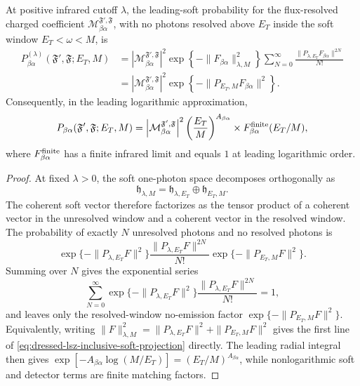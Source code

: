 \begin{proposition}
\label{prop:dressed-lsz-detector-inclusive-soft-factor}
At positive infrared cutoff \(\lambda\), the leading-soft probability for
the flux-resolved charged coefficient
\(\mathcal M^{\mathfrak F',\mathfrak F}_{\beta\alpha}\), with no photons
resolved above \(E_T\) inside the soft window \(E_T<\omega<M\), is
\begin{equation}
\begin{aligned}
  P_{\beta\alpha}^{(\lambda)}
  (\mathfrak F',\mathfrak F;E_T,M)
  &=
  \left|
    \mathcal M^{\mathfrak F',\mathfrak F}_{\beta\alpha}
  \right|^2
  \exp\!\left\{
    -\|F_{\beta\alpha}\|_{\lambda,M}^2
  \right\}
  \sum_{N=0}^{\infty}
  \frac{
    \|P_{\lambda,E_T}F_{\beta\alpha}\|^{2N}
  }{N!}
\\
  &=
  \left|
    \mathcal M^{\mathfrak F',\mathfrak F}_{\beta\alpha}
  \right|^2
  \exp\!\left\{
    -\|P_{E_T,M}F_{\beta\alpha}\|^2
  \right\}.
\end{aligned}
\label{eq:dressed-lsz-inclusive-soft-projection}
\end{equation}
Consequently, in the leading logarithmic approximation,
\begin{equation}
  P_{\beta\alpha}
  (\mathfrak F',\mathfrak F;E_T,M)
  =
  \left|
    \mathcal M^{\mathfrak F',\mathfrak F}_{\beta\alpha}
  \right|^2
  \left(\frac{E_T}{M}\right)^{A_{\beta\alpha}}
  \times
  F_{\beta\alpha}^{\rm finite}(E_T/M),
  \label{eq:dressed-lsz-flux-resolved-inclusive-rate}
\end{equation}
where \(F_{\beta\alpha}^{\rm finite}\) has a finite infrared limit and equals
\(1\) at leading logarithmic order.
\end{proposition}

\begin{proof}
At fixed \(\lambda>0\), the soft one-photon space decomposes orthogonally as
\[
  \mathfrak h_{\lambda,M}
  =
  \mathfrak h_{\lambda,E_T}
  \oplus
  \mathfrak h_{E_T,M}.
\]
The coherent soft vector therefore factorizes as the tensor product of a
coherent vector in the unresolved window and a coherent vector in the
resolved window.  The probability of exactly \(N\) unresolved photons and no
resolved photons is
\[
  \exp\{-\|P_{\lambda,E_T}F\|^2\}
  \frac{\|P_{\lambda,E_T}F\|^{2N}}{N!}
  \exp\{-\|P_{E_T,M}F\|^2\}.
\]
Summing over \(N\) gives the exponential series
\[
  \sum_{N=0}^{\infty}
  \exp\{-\|P_{\lambda,E_T}F\|^2\}
  \frac{\|P_{\lambda,E_T}F\|^{2N}}{N!}
  =
  1,
\]
and leaves only the resolved-window no-emission factor
\(\exp\{-\|P_{E_T,M}F\|^2\}\).  Equivalently, writing
\(\|F\|_{\lambda,M}^2=
\|P_{\lambda,E_T}F\|^2+\|P_{E_T,M}F\|^2\) gives the first line of
\eqref{eq:dressed-lsz-inclusive-soft-projection} directly.  The leading
radial integral then gives
\(\exp[-A_{\beta\alpha}\log(M/E_T)]=(E_T/M)^{A_{\beta\alpha}}\), while
nonlogarithmic soft and detector terms are finite matching factors.
\end{proof}

